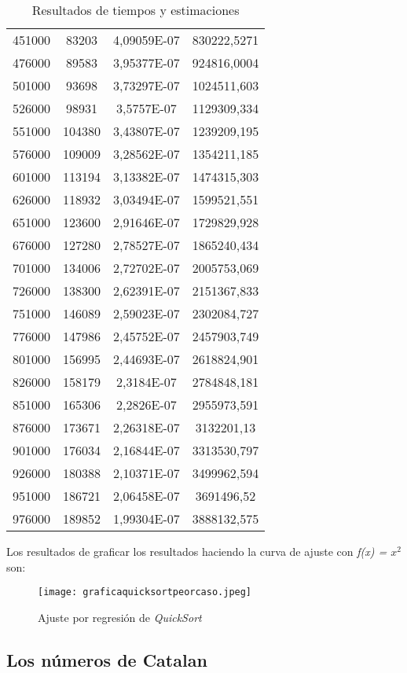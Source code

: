 \documentclass[a4paper,12pt]{article} %
\begin{document}
\begin{table}[H]
{\begin{tabular}{|c|c|c|c|}
	451000 & 83203  & 4,09059E-07 & 830222,5271  \\
	476000 & 89583  & 3,95377E-07 & 924816,0004  \\
	501000 & 93698  & 3,73297E-07 & 1024511,603  \\
	526000 & 98931  & 3,5757E-07  & 1129309,334  \\
	551000 & 104380 & 3,43807E-07 & 1239209,195  \\
	576000 & 109009 & 3,28562E-07 & 1354211,185  \\
	601000 & 113194 & 3,13382E-07 & 1474315,303  \\
	626000 & 118932 & 3,03494E-07 & 1599521,551  \\
	651000 & 123600 & 2,91646E-07 & 1729829,928  \\
	676000 & 127280 & 2,78527E-07 & 1865240,434  \\
	701000 & 134006 & 2,72702E-07 & 2005753,069  \\
	726000 & 138300 & 2,62391E-07 & 2151367,833  \\
	751000 & 146089 & 2,59023E-07 & 2302084,727  \\
	776000 & 147986 & 2,45752E-07 & 2457903,749  \\
	801000 & 156995 & 2,44693E-07 & 2618824,901  \\
	826000 & 158179 & 2,3184E-07  & 2784848,181  \\
	851000 & 165306 & 2,2826E-07  & 2955973,591  \\
	876000 & 173671 & 2,26318E-07 & 3132201,13   \\
	901000 & 176034 & 2,16844E-07 & 3313530,797  \\
	926000 & 180388 & 2,10371E-07 & 3499962,594  \\
	951000 & 186721 & 2,06458E-07 & 3691496,52   \\
	976000 & 189852 & 1,99304E-07 & 3888132,575  \\
	\hline
	\end{tabular}%
	}
	\caption{Resultados de tiempos y estimaciones}
	\label{tab:resultados}
	\end{table}

	Los resultados de graficar los resultados haciendo la curva de ajuste con \textit{f(x) = $x^{2}$} son:
	\begin{figure}[ht]
		\centering
		\texttt{[image: graficaquicksortpeorcaso.jpeg]}
		\caption{Ajuste por regresión de \textit{QuickSort}}
	  \end{figure}
	  
\subsection{Los números de Catalan}
\end{document}
